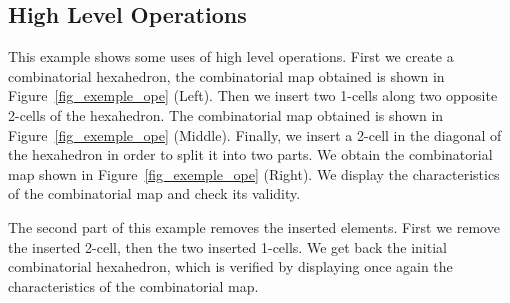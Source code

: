 \subsection{High Level Operations}
\label{ssec-exemple-operations}
This example shows some uses of high level operations.  First we
create a combinatorial hexahedron, the combinatorial map obtained is shown in
Figure~\ref{fig_exemple_ope} (Left). Then we insert two 1-cells along
two opposite 2-cells of the hexahedron. The combinatorial map
obtained is shown in Figure~\ref{fig_exemple_ope} (Middle).  Finally, we
insert a 2-cell in the diagonal of the hexahedron in order to split
it into two parts. We obtain the combinatorial map shown in
Figure~\ref{fig_exemple_ope} (Right). We display the characteristics
of the combinatorial map and check its validity.

The second part of this example removes the inserted elements. First
we remove the inserted 2-cell, then the two inserted 1-cells. We get
back the initial combinatorial hexahedron, which is verified by displaying once
again the characteristics of the combinatorial map.

